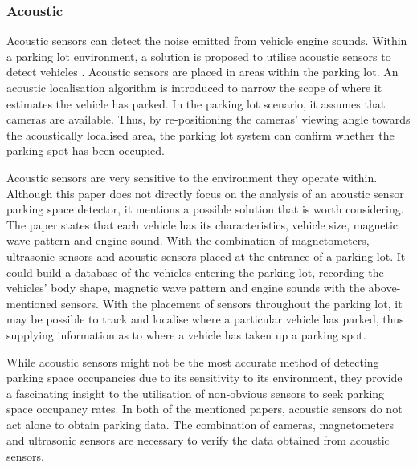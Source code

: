 \subsubsection*{Acoustic}
Acoustic sensors can detect the noise emitted from vehicle engine sounds. Within a parking lot environment, a solution is proposed to utilise acoustic sensors to detect vehicles \citep{Na2009AcousticSystem}. Acoustic sensors are placed in areas within the parking lot. An acoustic localisation algorithm is introduced to narrow the scope of where it estimates the vehicle has parked. In the parking lot scenario, it assumes that cameras are available. Thus, by re-positioning the cameras' viewing angle towards the acoustically localised area, the parking lot system can confirm whether the parking spot has been occupied. 

Acoustic sensors are very sensitive to the environment they operate within. Although this paper \citep{Lee2008IntelligentNetworks} does not directly focus on the analysis of an acoustic sensor parking space detector, it mentions a possible solution that is worth considering. The paper states that each vehicle has its characteristics, vehicle size, magnetic wave pattern and engine sound. With the combination of magnetometers, ultrasonic sensors and acoustic sensors placed at the entrance of a parking lot. It could build a database of the vehicles entering the parking lot, recording the vehicles' body shape, magnetic wave pattern and engine sounds with the above-mentioned sensors. With the placement of sensors throughout the parking lot, it may be possible to track and localise where a particular vehicle has parked, thus supplying information as to where a vehicle has taken up a parking spot.

While acoustic sensors might not be the most accurate method of detecting parking space occupancies due to its sensitivity to its environment, they provide a fascinating insight to the utilisation of non-obvious sensors to seek parking space occupancy rates. In both of the mentioned papers, acoustic sensors do not act alone to obtain parking data. The combination of cameras, magnetometers and ultrasonic sensors are necessary to verify the data obtained from acoustic sensors. 